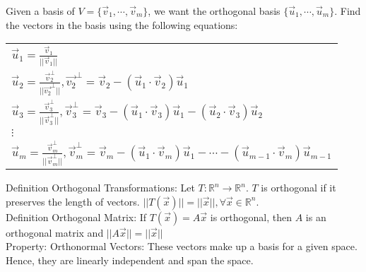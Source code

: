 \documentclass[11pt]{article}
\begin{document}
\newpage
Given a basis of $V=\lbrace\vec{v}_1,\cdots,\vec{v}_m\rbrace$, we want the orthogonal basis $\lbrace\vec{u}_1,\cdots,\vec{u}_m\rbrace$. Find the vectors in the basis using the following equations:
\begin{center}\begin{tabular}{l}
$\vec{u}_1=\frac{\vec{v}_1}{||\vec{v}_1||}$\vspace{0.1 cm}\\
$\vec{u}_2=\frac{\vec{v}_2^\perp}{||\vec{v_2}^\perp||},\vec{v_2}^\perp=\vec{v}_2-(\vec{u}_1\cdot\vec{v}_2)\vec{u}_1$\vspace{0.1 cm}\\
$\vec{u}_3=\frac{\vec{v}_3^\perp}{||\vec{v}_3^\perp||},\vec{v}_3^\perp=\vec{v}_3-(\vec{u}_1\cdot \vec{v}_3)\vec{u}_1-(\vec{u}_2\cdot\vec{v}_3)\vec{u}_2$\vspace{0.1 cm}\\
$\vdots$\vspace{0.1 cm}\\
$\vec{u}_m=\frac{\vec{v}_m^\perp}{||\vec{v}_m^\perp||},\vec{v}_m^\perp=\vec{v}_m-(\vec{u}_1\cdot\vec{v}_m)\vec{u}_1-\cdots-(\vec{u}_{m-1}\cdot\vec{v}_m)\vec{u}_{m-1}$\\
\end{tabular}\end{center}

\noindent
Definition Orthogonal Transformations: Let $T:\mathbb{R}^n\rightarrow\mathbb{R}^n$. $T$ is orthogonal if it preserves the length of vectors. $||T(\vec{x})||=||\vec{x}||,\forall\vec{x}\in\mathbb{R}^n$.\\

\noindent
Definition Orthogonal Matrix: If $T(\vec{x})=A\vec{x}$ is orthogonal, then $A$ is an orthogonal matrix and $||A\vec{x}||=||\vec{x}||$\\

\noindent
Property: Orthonormal Vectors: These vectors make up a basis for a given space. Hence, they are linearly independent and span the space.\\
\end{document}
